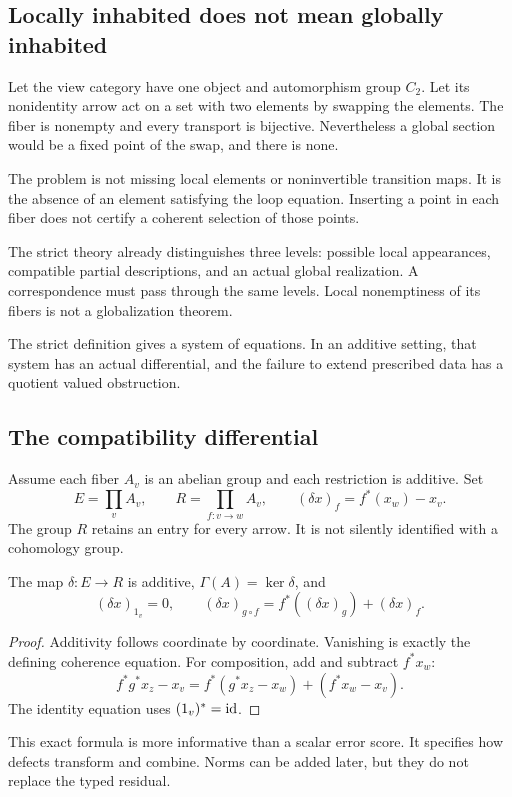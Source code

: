 \subsection{Locally inhabited does not mean globally inhabited}
\begin{KSexample}\label{KS:KS07}
Let the view category have one object and automorphism group \(C_2\). Let its nonidentity arrow act on a set with two elements by swapping the elements. The fiber is nonempty and every transport is bijective. Nevertheless a global section would be a fixed point of the swap, and there is none.
\end{KSexample}
The problem is not missing local elements or noninvertible transition maps. It is the absence of an element satisfying the loop equation. Inserting a point in each fiber does not certify a coherent selection of those points.

\begin{insight}
The strict theory already distinguishes three levels: possible local appearances, compatible partial descriptions, and an actual global realization. A correspondence must pass through the same levels. Local nonemptiness of its fibers is not a globalization theorem.
\end{insight}



\label{KS:sec:obstruction}
The strict definition gives a system of equations. In an additive setting, that system has an actual differential, and the failure to extend prescribed data has a quotient valued obstruction.

\subsection{The compatibility differential}
Assume each fiber \(A_v\) is an abelian group and each restriction is additive. Set
\[
 E=\prod_v A_v,\qquad R=\prod_{f:v\to w}A_v,
 \qquad (\delta x)_f=f^*(x_w)-x_v.
\]
The group \(R\) retains an entry for every arrow. It is not silently identified with a cohomology group.

\begin{KSproposition}\label{KS:KS08}
The map \(\delta:E\to R\) is additive, \(\Gamma(A)=\ker\delta\), and
\[
 (\delta x)_{1_v}=0,\qquad
 (\delta x)_{g\circ f}=f^*((\delta x)_g)+(\delta x)_f.
\]
\end{KSproposition}
\begin{proof}
Additivity follows coordinate by coordinate. Vanishing is exactly the defining coherence equation. For composition, add and subtract \(f^*x_w\):
\[
 f^*g^*x_z-x_v
 =f^*(g^*x_z-x_w)+(f^*x_w-x_v).
\]
The identity equation uses \((1_v)^*=\operatorname{id}\).
\end{proof}
This exact formula is more informative than a scalar error score. It specifies how defects transform and combine. Norms can be added later, but they do not replace the typed residual.

